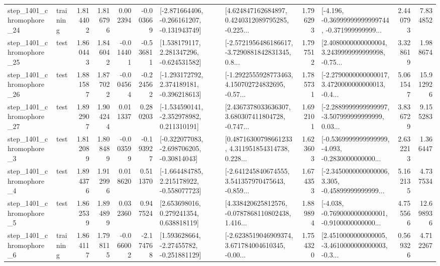\begin{tabular}{llrrrrllrlrr}
 step\_1401\_chromophore\_24 &  training &      1.814402 &    1.816796 &      0.002394 & -0.003669 &  [-2.871664406, -0.266161207, -0.131943749] &  [4.624847162684897, 0.4240312089795285, -0.225... &       1.796293 &  [-4.196, -0.36999999999999744, -0.371999999999... &            2.440793 &          7.834852 \\
 step\_1401\_chromophore\_25 &      test &      1.860443 &    1.846042 &     -0.014401 & -0.536811 &    [1.538179117, 2.281347296, -0.624531582] &  [-2.5721956486186617, -3.7290881842831345, 0.8... &       1.797512 &  [2.4080000000000004, 3.2439999999999998, -0.75... &            3.328619 &          1.988674 \\
 step\_1401\_chromophore\_26 &      test &      1.881587 &    1.877022 &     -0.004564 & -0.224562 &   [-1.293172792, 2.374189181, -0.396218613] &  [-1.2922555928773463, 4.150702724832695, -0.57... &       1.785731 &  [-2.2790000000000017, 3.4720000000000013, -0.4... &            5.061547 &         15.912926 \\
 step\_1401\_chromophore\_27 &      test &      1.892907 &    1.904244 &      0.011337 &  0.280203 &   [-1.534590141, -2.352978982, 0.211310191] &  [2.4367378033636307, 3.680307411804728, -0.747... &       1.692101 &  [-2.2889999999999997, -3.507999999999999, 0.03... &            3.836729 &          9.155283 \\
  step\_1401\_chromophore\_3 &      test &      1.812089 &    1.808489 &     -0.003599 & -0.193927 &   [-0.322077083, -2.698706205, -0.30814043] &  [0.48716300798661233, 4.311951854314738, 0.228... &       1.623603 &  [-0.5369999999999999, -4.093, -0.2830000000000... &            2.632213 &          1.366447 \\
  step\_1401\_chromophore\_4 &      test &      1.894376 &    1.912996 &      0.018620 &  0.511370 &   [-1.664484785, 2.215178922, -0.558077723] &  [-2.641245840674555, 3.541357970475643, -0.859... &       1.674353 &  [-2.3450000000000006, 3.305, -0.45899999999999... &            5.162135 &          4.737534 \\
  step\_1401\_chromophore\_5 &      test &      1.862539 &    1.894899 &      0.032360 &  0.947524 &     [2.653698016, 0.279241354, 0.638818119] &  [4.338420625812576, -0.0787868110802438, 1.416... &       1.889894 &  [-4.038, -0.7690000000000001, -0.9100000000000... &            4.755566 &         12.698936 \\
  step\_1401\_chromophore\_6 &  training &      1.864117 &    1.798115 &     -0.066002 & -2.174768 &    [1.593628664, -2.27455782, -0.251881129] &  [-2.6238519046909374, 3.671784004610345, -0.00... &       1.754320 &  [2.4510000000000005, -3.4610000000000003, -0.3... &            0.569326 &          4.712267 \\

\end{tabular}
